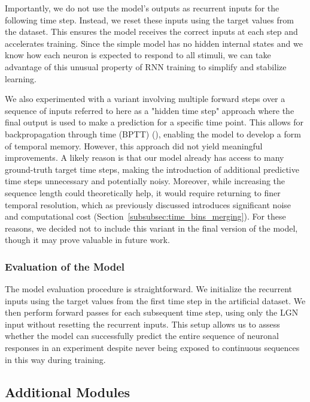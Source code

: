 Importantly, we do not use the model's outputs as recurrent inputs for the following time step. Instead, we reset these inputs using the target values from the dataset. This ensures the model receives the correct inputs at each step and accelerates training. Since the simple model has no hidden internal states and we know how each neuron is expected to respond to all stimuli, we can take advantage of this unusual property of RNN training to simplify and stabilize learning.

We also experimented with a variant involving multiple forward steps over a sequence of inputs referred to here as a "hidden time step" approach where the final output is used to make a prediction for a specific time point. This allows for backpropagation through time (BPTT) (\citet{webos1990btt}), enabling the model to develop a form of temporal memory. However, this approach did not yield meaningful improvements. A likely reason is that our model already has access to many ground-truth target time steps, making the introduction of additional predictive time steps unnecessary and potentially noisy. Moreover, while increasing the sequence length could theoretically help, it would require returning to finer temporal resolution, which as previously discussed introduces significant noise and computational cost (Section~\ref{subsubsec:time_bins_merging}). For these reasons, we decided not to include this variant in the final version of the model, though it may prove valuable in future work.

\subsubsection{Evaluation of the Model}
\label{subsubsec:evaluation_model}

The model evaluation procedure is straightforward. We initialize the recurrent inputs using the target values from the first time step in the artificial dataset. We then perform forward passes for each subsequent time step, using only the LGN input without resetting the recurrent inputs. This setup allows us to assess whether the model can successfully predict the entire sequence of neuronal responses in an experiment despite never being exposed to continuous sequences in this way during training.

\subsection{Additional Modules}
\label{subsec:additional_modules}

